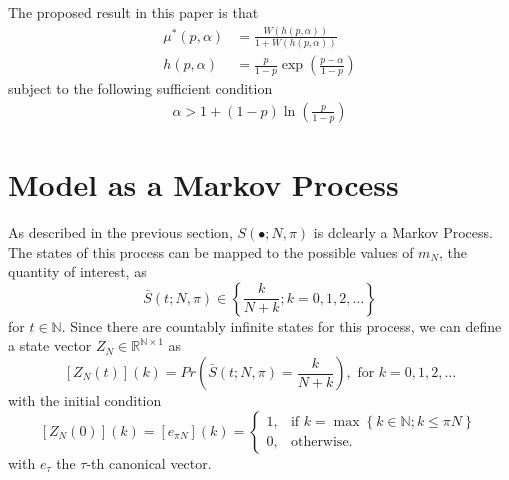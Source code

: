 \documentclass{article}
\newcommand{\N}{\mathbb{N}}
\newcommand{\R}{\mathbb{R}}
\newcommand{\sset}[1]{\left\{ #1 \right\}}
\newcommand{\ppar}[1]{\left( #1 \right)}
\newcommand{\spar}[1]{\left[ #1 \right]}
\begin{document}
The proposed result in this paper is that
\begin{align}
    {\mu^*}\ppar{p, \alpha} &= \frac{W\ppar{h\ppar{p, \alpha}}}{1+W\ppar{h\ppar{p, \alpha}}}
    \\
    h\ppar{p, \alpha} &=
    \frac{p}{1-p} \exp{\ppar{\frac{p-\alpha}{1-p}}}
\end{align}
subject to the following sufficient condition
\begin{align}
    \alpha > 1 + \ppar{1-p} \ln{\ppar{\frac{p}{1-p}}} 
\end{align}

\section{Model as a Markov Process}

As described in the previous section, $S(\bullet; N, \pi)$ is dclearly a Markov Process.
%
The states of this process can be mapped to the possible values of $m_N$, the quantity of interest, as
\begin{equation}
    \bar{S}(t; N, \pi) \in \sset{\frac{k}{N+k}; k = 0, 1, 2, \dots}
\end{equation}
for $t\in \N$. 
%
Since there are countably infinite states for this process, we can define a state vector $Z_N \in \R^{\N\times 1}$ as
\begin{equation}
    \spar{Z_N(t)}(k) = Pr\ppar{\bar{S}(t; N, \pi) = \frac{k}{N+k}}, \text{ for } k=0,1, 2, \dots
\end{equation}
with the initial condition
\begin{equation}
    \spar{Z_N(0)}(k) = \spar{e_{\pi N}}(k) = \begin{cases}
        1, &\text{if } k = \max\sset{k\in \N; k \leq \pi N} \\
        0, &\text{otherwise.}
    \end{cases}
\end{equation}
with $e_\tau$ the $\tau$-th canonical vector.
\end{document}
